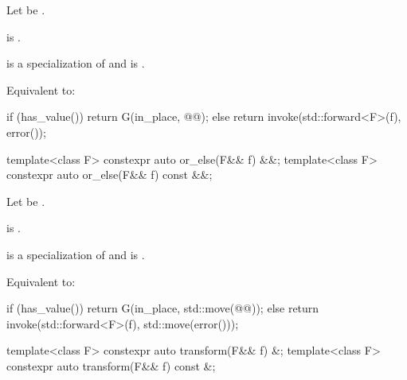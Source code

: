 \begin{itemdescr}
\pnum
Let  be .

\pnum
\constraints
{} is .

\pnum
\mandates
{} is a specialization of  and
 is .

\pnum
\effects
Equivalent to:
\begin{codeblock}
if (has_value())
  return G(in_place, @@);
else
  return invoke(std::forward<F>(f), error());
\end{codeblock}
\end{itemdescr}

%
\begin{itemdecl}
template<class F> constexpr auto or_else(F&& f) &&;
template<class F> constexpr auto or_else(F&& f) const &&;
\end{itemdecl}

\begin{itemdescr}
\pnum
Let  be
.

\pnum
\constraints
{} is .

\pnum
\mandates
{} is a specialization of  and
 is .

\pnum
\effects
Equivalent to:
\begin{codeblock}
if (has_value())
  return G(in_place, std::move(@@));
else
  return invoke(std::forward<F>(f), std::move(error()));
\end{codeblock}
\end{itemdescr}

%
\begin{itemdecl}
template<class F> constexpr auto transform(F&& f) &;
template<class F> constexpr auto transform(F&& f) const &;
\end{itemdecl}

